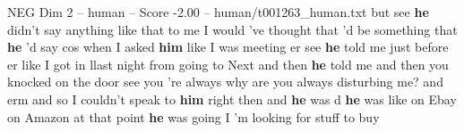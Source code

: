 \begin{textsample}{NEG Dim 2 – human – Score -2.00 – human/t001263\_human.txt}  \label{ex:f2_neg_014}
but see \textbf{he} didn't say anything like that to me I would 've thought that 'd be something that \textbf{he} 'd say cos when I asked \textbf{him} like I was meeting er see \textbf{he} told me just before er like I got in llast night from going to Next and then \textbf{he} told me and then you knocked on the door see you 're always why are you always disturbing me? and erm and so I couldn't speak to \textbf{him} right then and \textbf{he} was d \textbf{he} was like on Ebay on Amazon at that point \textbf{he} was going I 'm looking for stuff to buy

\end{textsample}
